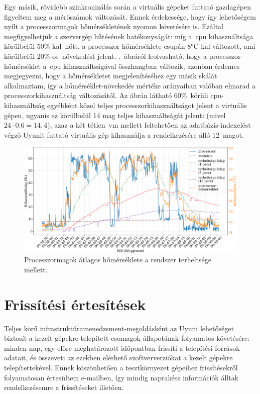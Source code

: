 Egy másik, rövidebb szinkronizálás során a virtuális gépeket futtató gazdagépen figyeltem meg a mérőszámok változását. Ennek érdekessége, hogy így lehetőségem nyílt a processzormagok hőmérsékletének nyomon követésére is. Ezáltal megfigyelhetjük a szervergép hűtésének hatékonyságát: míg a~\acrshort{cpu} kihasználtsága körülbelül 50\%-kal~nőtt, a processzor hőmérséklete csupán 8°C-kal változott, ami körülbelül 20\%-os~növekedést jelent. .~ábráról leolvasható, hogy a processzor-hőmérséklet a~\acrshort{cpu} kihasználtságával összhangban változik, azonban érdemes megjegyezni, hogy a hőmérsékletet megjelenítéséhez egy másik skálát alkalmaztam, így a hőmérséklet-növekedés mértéke arányaiban valóban elmarad a processzorkihasználtság változásától. Az ábrán látható 60\%~körüli \acrshort{cpu}-kihasználtság egyébként közel teljes processzorkihasználtságot jelent a virtuális gépen, ugyanis ez körülbelül 14 mag teljes kihasználtságát jelenti (mivel $ 24 \cdot 0.6  = 14,4 $), azaz a két tétlen~\acrshort{vm} mellett feltehetően az adatbázis-indexelést végző Uyunit futtató virtuális gép kihasználja a rendelkezésére álló 12~magot.

\begin{figure}[ht]
	\centering
	\includegraphics[width=15cm]{figures/reposync-vhost-cputemp.pdf}
	\caption{Processzormagok átlagos hőmérséklete a rendszer terheltsége mellett.}
	\label{fig:reposync-vhost-cputemp}
\end{figure}

\section{Frissítési értesítések}
Teljes körű infrastruktúramenedzsment-megoldásként az Uyuni lehetőséget biztosít a kezelt gépekre telepített csomagok állapotának folyamatos követésére: minden nap, egy előre meghatározott időpontban frissíti a telepítési források adatait, és összeveti az ezekben elérhető szoftververziókat a kezelt gépekre telepítettekével. Ennek köszönhetően a tesztkörnyezet gépeihez  frissítésekről folyamatosan értesültem e-mailben, így mindig naprakész információk álltak rendelkezésemre a frissítéseket illetően.

